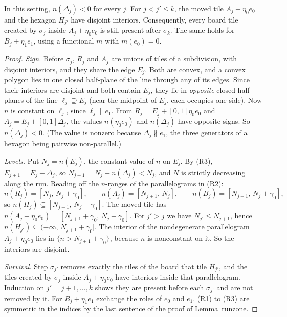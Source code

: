 \documentclass[11pt]{article}
\theoremstyle{definition}\newtheorem{definition}[theorem]{Definition}\newtheorem{remark}[theorem]{Remark}
\begin{document}
\begin{lemma}\label{lem:runsurv}
In this setting, $n(\Delta_j)<0$ for every $j$. For $j<j'\le k$, the moved tile $A_j+\eta_0e_0$ and the hexagon $H_{j'}$ have disjoint interiors.
Consequently, every board tile created by $\sigma_j$ inside $A_j+\eta_0e_0$ is still present after $\sigma_k$. The same holds for $B_j+\eta_1e_1$, using a functional $m$ with $m(e_0)=0$.
\end{lemma}
\begin{proof}
\emph{Sign.} Before $\sigma_j$, $R_j$ and $A_j$ are unions of tiles of a subdivision, with disjoint interiors, and they share the edge $E_j$. Both are convex, and a convex polygon lies in one closed half-plane of the line through any of its edges.
Since their interiors are disjoint and both contain $E_j$, they lie in \emph{opposite} closed half-planes of the line $\ell_j\supseteq E_j$ (near the midpoint of $E_j$, each occupies one side).
Now $n$ is constant on $\ell_j$, since $\ell_j\parallel e_1$. From $R_j=E_j+[0,1]\eta_0e_0$ and $A_j=E_j+[0,1]\Delta_j$, the values $n(\eta_0e_0)$ and $n(\Delta_j)$ have opposite signs. So $n(\Delta_j)<0$.
(The value is nonzero because $\Delta_j\nparallel e_1$, the three generators of a hexagon being pairwise non-parallel.)

\emph{Levels.} Put $N_j=n(E_j)$, the constant value of $n$ on $E_j$. By (R3), $E_{j+1}=E_j+\Delta_j$, so $N_{j+1}=N_j+n(\Delta_j)<N_j$, and $N$ is strictly decreasing along the run.
Reading off the $n$-ranges of the parallelograms in (R2):
\[
n(R_j)=[N_j,\,N_j+\gamma_0],\qquad n(A_j)=[N_{j+1},\,N_j],\qquad n(B_j)=[N_{j+1},\,N_j+\gamma_0],
\]
so $n(H_j)\subseteq[N_{j+1},\,N_j+\gamma_0]$. The moved tile has $n(A_j+\eta_0e_0)=[N_{j+1}+\gamma_0,\,N_j+\gamma_0]$.
For $j'>j$ we have $N_{j'}\le N_{j+1}$, hence $n(H_{j'})\subseteq(-\infty,\,N_{j+1}+\gamma_0]$.
The interior of the nondegenerate parallelogram $A_j+\eta_0e_0$ lies in $\{n>N_{j+1}+\gamma_0\}$, because $n$ is nonconstant on it. So the interiors are disjoint.

\emph{Survival.} Step $\sigma_{j'}$ removes exactly the tiles of the board that tile $H_{j'}$, and the tiles created by $\sigma_j$ inside $A_j+\eta_0e_0$ have interiors inside that parallelogram. Induction on $j'=j+1,\dots,k$ shows they are present before each $\sigma_{j'}$ and are not removed by it.
For $B_j+\eta_1e_1$ exchange the roles of $e_0$ and $e_1$. (R1) to (R3) are symmetric in the indices by the last sentence of the proof of Lemma~runzone.
\end{proof}
\end{document}
